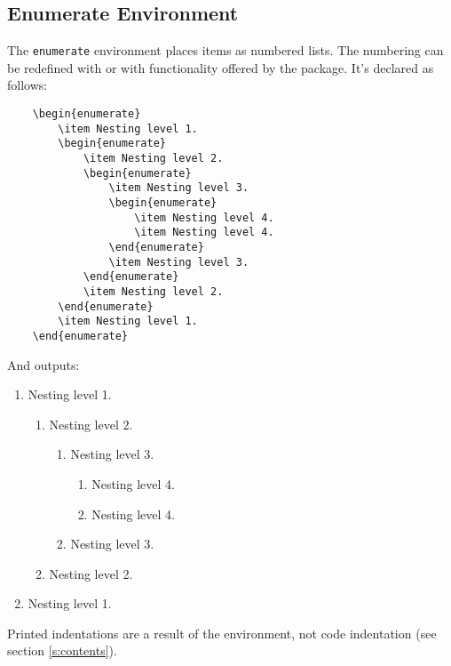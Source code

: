 \subsection{Enumerate Environment}
%
The \verb|enumerate| environment places items as numbered lists.  The
numbering can be redefined with  or with
functionality offered by the  package.  It's declared
as follows:
\begin{verbatim}
	\begin{enumerate}
    	\item Nesting level 1.
	    \begin{enumerate}
    	    \item Nesting level 2.
        	\begin{enumerate}
            	\item Nesting level 3.
	            \begin{enumerate}
    	            \item Nesting level 4.
        	        \item Nesting level 4.
	            \end{enumerate}
    	        \item Nesting level 3.
        	\end{enumerate}
	        \item Nesting level 2.
    	\end{enumerate}
	    \item Nesting level 1.
	\end{enumerate}
\end{verbatim}
And outputs:
\begin{enumerate}
\item Nesting level 1.
  \begin{enumerate}
  \item Nesting level 2.
    \begin{enumerate}
    \item Nesting level 3.
      \begin{enumerate}
      \item Nesting level 4.
      \item Nesting level 4.
      \end{enumerate}
    \item Nesting level 3.
    \end{enumerate}
  \item Nesting level 2.
  \end{enumerate}
\item Nesting level 1.
\end{enumerate}
Printed indentations are a result of the environment, not code
indentation (see section \ref{s:contents}).
%
